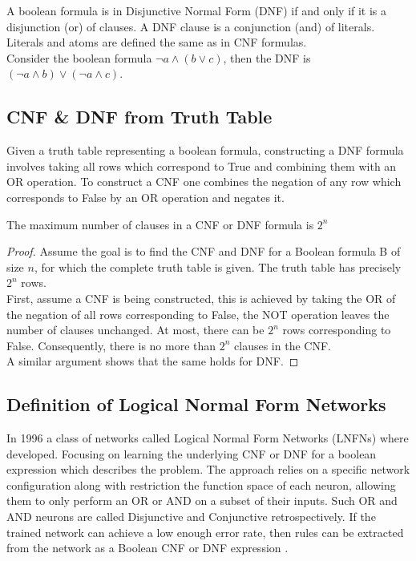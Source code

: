 A boolean formula is in Disjunctive Normal Form (DNF) if and only if it is a disjunction (or) of clauses. A DNF clause is a conjunction (and) of literals. Literals and atoms are defined the same as in CNF formulas.\\

Consider the boolean formula $\lnot a \land (b \lor c)$, then the DNF is $(\lnot a \land b) \lor (\lnot a \land c)$.\\

\subsection{CNF \& DNF from Truth Table} \label{subsec:construct-cnfdnf}
Given a truth table representing a boolean formula, constructing a DNF formula involves taking all rows which correspond to True and combining them with an OR operation. To construct a CNF one combines the negation of any row which corresponds to False by an OR operation and negates it.

\begin{theorem}
	The maximum number of clauses in a CNF or DNF formula is $2^n$
	\label{thm:max-clause-cnfdnf}
\end{theorem}

\begin{proof}
	Assume the goal is to find the CNF and DNF for a Boolean formula B of size $n$, for which the complete truth table is given. The truth table has precisely $2^n$ rows.\\
	
	First, assume a CNF is being constructed, this is achieved by taking the OR of the negation of all rows corresponding to False, the NOT operation leaves the number of clauses unchanged. At most, there can be $2^n$ rows corresponding to False. Consequently, there is no more than $2^n$ clauses in the CNF.\\
	
	A similar argument shows that the same holds for DNF.
\end{proof}

\subsection{Definition of Logical Normal Form Networks}
In 1996 a class of networks called Logical Normal Form Networks \cite{herrmann1996backpropagation} (LNFNs) where developed. Focusing on learning the underlying CNF or DNF for a boolean expression which describes the problem. The approach relies on a specific network configuration along with restriction the function space of each neuron, allowing them to only perform an OR or AND on a subset of their inputs. Such OR and AND neurons are called Disjunctive and Conjunctive retrospectively. If the trained network can achieve a low enough error rate, then rules can be extracted from the network as a Boolean CNF or DNF expression \cite{herrmann1996backpropagation}.\\

